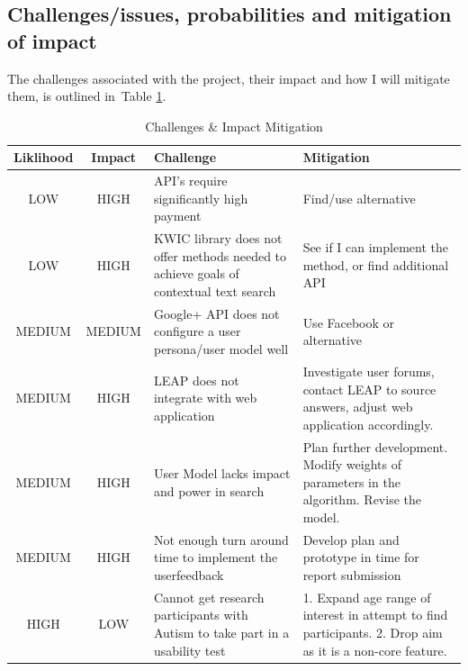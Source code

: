 \documentclass[a4paper, 11pt]{article}
\begin{document}
\begin{justify}
\section{Challenges/issues, probabilities and mitigation of impact}
The challenges associated with the project, their impact and how I will mitigate them, is outlined in~Table \ref{risks}. 
\begin{table}[H]
\caption{Challenges \& Impact Mitigation} 
\centering
\begin{tabular}{|c | c | p{6cm} | p{6cm} |}
\hline\hline 
Liklihood & Impact & Challenge & Mitigation\\ [0.5ex]
\hline 
LOW & HIGH & API's require significantly high payment & Find/use alternative\\
\hline 
LOW & HIGH & KWIC library does not offer methods needed to achieve goals of contextual text search & See if I can implement the method, or find additional API\\
\hline 
MEDIUM & MEDIUM & Google+ API does not configure a user persona/user model well & Use Facebook or alternative\\
\hline 
MEDIUM & HIGH & LEAP does not integrate with web application & Investigate user forums, contact LEAP to source answers, adjust web application accordingly.\\
\hline
MEDIUM & HIGH & User Model lacks impact and power in search & Plan further development. Modify weights of parameters in the algorithm. Revise the model. \\
\hline 
MEDIUM & HIGH & Not enough turn around time to implement the userfeedback & Develop plan and prototype in time for report submission\\
\hline
HIGH & LOW & Cannot get research participants with Autism to take part in a usability test & 1. Expand age range of interest in attempt to find participants. 2. Drop aim as it is a non-core feature.\\ 
\hline

\end{tabular}
\label{risks} 
\end{table}


\end{justify}
\end{document}
